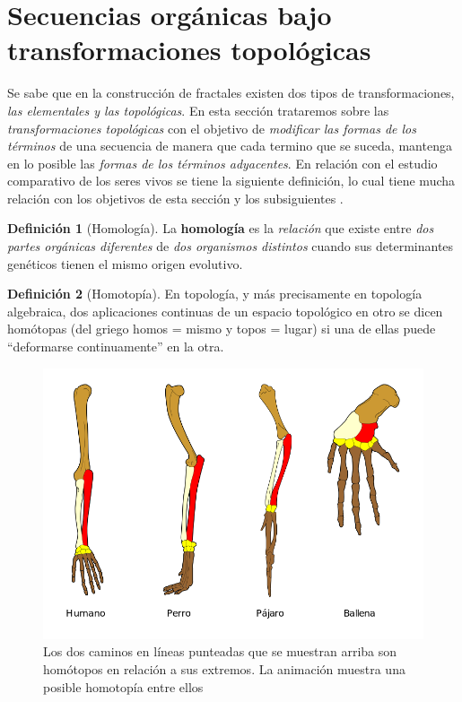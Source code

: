 \documentclass[
  11pt,
]{krantz}
\theoremstyle{definition}
\newtheorem{definition}{Definición}[chapter]
\theoremstyle{definition}
\theoremstyle{definition}
\theoremstyle{definition}
\theoremstyle{remark}
\begin{document}
\hypertarget{secuencias-orguxe1nicas-bajo-transformaciones-topoluxf3gicas}{%
\section{Secuencias orgánicas bajo transformaciones topológicas}\label{secuencias-orguxe1nicas-bajo-transformaciones-topoluxf3gicas}}

Se sabe que en la construcción de fractales existen dos tipos de transformaciones, \emph{las elementales y las topológicas}. En esta sección trataremos sobre las \emph{transformaciones topológicas} con el objetivo de \emph{modificar las formas de los términos} de una secuencia de manera que cada termino que se suceda, mantenga en lo posible las \emph{formas de los términos adyacentes}. En relación con el estudio comparativo de los seres vivos se tiene la siguiente definición, lo cual tiene mucha relación con los objetivos de esta sección y los subsiguientes \citet{homology}.

\begin{definition}[Homología]
\protect\hypertarget{def:homologia}{}\label{def:homologia}La \textbf{homología} es la \emph{relación} que existe entre \emph{dos partes orgánicas diferentes} de \emph{dos organismos distintos} cuando sus determinantes genéticos tienen el mismo origen evolutivo.
\end{definition}

\begin{definition}[Homotopía]
\protect\hypertarget{def:homotopia}{}\label{def:homotopia}En topología, y más precisamente en topología algebraica, dos aplicaciones continuas de un espacio topológico en otro se dicen homótopas (del griego homos = mismo y topos = lugar) si una de ellas puede ``deformarse continuamente'' en la otra.
\end{definition}

\begin{figure}[!ht]

{\centering \includegraphics[width=0.5\linewidth]{homologia} 

}

\caption{Los dos caminos en líneas punteadas que se muestran arriba son homótopos en relación a sus extremos. La animación muestra una posible homotopía entre ellos}\label{fig:homotopia}
\end{figure}
\end{document}
